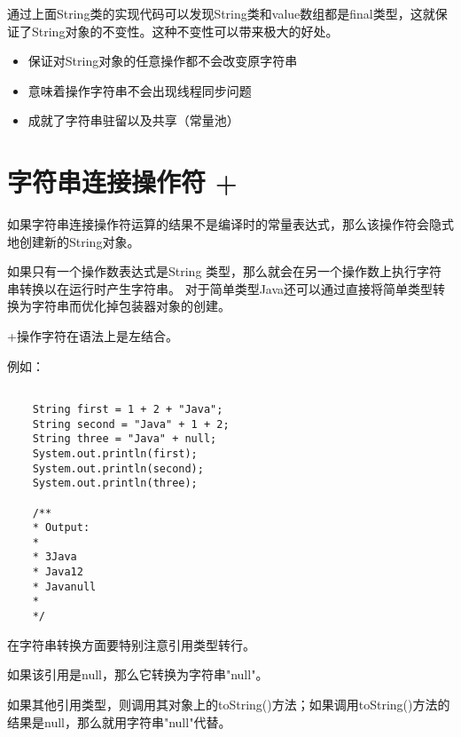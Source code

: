 通过上面String类的实现代码可以发现String类和value数组都是final类型，这就保证了String对象的不变性。这种不变性可以带来极大的好处。

\begin{itemize}
    \item 保证对String对象的任意操作都不会改变原字符串
    \item 意味着操作字符串不会出现线程同步问题
    \item 成就了字符串驻留以及共享（常量池）
\end{itemize}



\section{字符串连接操作符 + }


如果字符串连接操作符运算的结果不是编译时的常量表达式，那么该操作符会隐式地创建新的String对象。


如果只有一个操作数表达式是String 类型，那么就会在另一个操作数上执行字符串转换以在运行时产生字符串。 
对于简单类型Java还可以通过直接将简单类型转换为字符串而优化掉包装器对象的创建。

\textcolor{codepurple}{+}操作字符在语法上是左结合。

例如：

\begin{lstlisting}[style=cjava]

    String first = 1 + 2 + "Java";
    String second = "Java" + 1 + 2;
    String three = "Java" + null;
    System.out.println(first);
    System.out.println(second);
    System.out.println(three);

    /** 
    * Output: 
    * 
    * 3Java
    * Java12
    * Javanull
    * 
    */

\end{lstlisting}


在字符串转换方面要特别注意引用类型转行。

如果该引用是null，那么它转换为字符串"null"。

如果其他引用类型，则调用其对象上的toString()方法；如果调用toString()方法的结果是null，那么就用字符串"null"代替。
























































